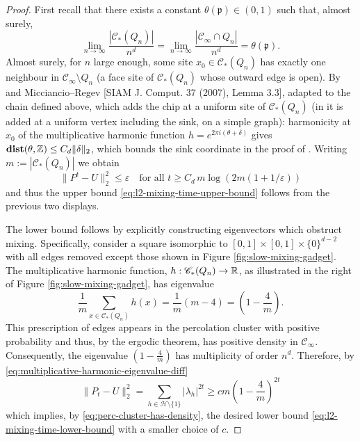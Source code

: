 \documentclass[12pt]{amsart}
\numberwithin{equation}{section}
\begin{document}
	\begin{proof}
		First recall that there exists a constant $\theta(\mathfrak{p}) \in (0,1)$ such that, almost surely, 
		\begin{equation} \label{eq:perc-cluster-has-density}
			\lim_{n \to \infty} \frac{|\mathscr{C}_{*}(Q_n)| }{n^d} = 	\lim_{n \to \infty} \frac{|\mathscr{C}_{\infty} \cap Q_n|}{n^d} = \theta(\mathfrak{p}).
		\end{equation}
		Almost surely, for $n$ large enough, some site $x_0 \in \mathscr{C}_{*}(Q_n)$ has exactly one neighbour in $\mathscr{C}_\infty \setminus Q_n$ (a face site of $\mathscr{C}_{*}(Q_n)$ whose outward edge is open). By \cite[Theorems 3.8 and 4.1]{jerison-levine-pike-2019} and Micciancio--Regev [SIAM J. Comput. 37 (2007), Lemma 3.3], adapted to the chain defined above, which adds the chip at a uniform site of $\mathscr{C}_{*}(Q_n)$ (in \cite{jerison-levine-pike-2019} it is added at a uniform vertex including the sink, on a simple graph): harmonicity at $x_0$ of the multiplicative harmonic function $h = e^{2 \pi i (\theta + \delta)}$ gives $\operatorname{\mathop{\bf dist{}}}(\theta , \operatorname{\mathbb{Z}}) \leq C_d \| \delta \|_2$, which bounds the sink coordinate in the proof of \cite[Theorem 3.8]{jerison-levine-pike-2019}. Writing $m := |\mathscr{C}_{*}(Q_n)|$ we obtain 
		\[
		\| P^t - U\|_2^2 \leq \varepsilon \quad \mbox{for all $t \geq  C_d \, m \log \left( 2 m (1 + 1/\varepsilon) \right)$}
		\]
		and thus the upper bound \eqref{eq:l2-mixing-time-upper-bound} follows from the previous two displays. 
		
		The lower bound follows by explicitly constructing eigenvectors which obstruct mixing. Specifically, 
		consider a square isomorphic to $[0, 1] \times [0,1] \times \{0\}^{d-2}$ with all edges removed
		except those shown in Figure \ref{fig:slow-mixing-gadget}.  The multiplicative harmonic function, $h: \mathscr{C}_*(Q_n) \to \operatorname{\mathbb{R}}$, as illustrated in the right of Figure \ref{fig:slow-mixing-gadget}, has eigenvalue 
		\[
		\frac{1}{m} \sum_{x \in \mathscr{C}_{*}(Q_n)} h(x) =  \frac{1}{m} \left( m - 4 \right) = (1 - \frac{4}{m}). 
		\]
		This prescription of edges appears in the percolation cluster with positive probability 
		and thus, by the ergodic theorem, has positive density in  $\mathscr{C}_{\infty}$. Consequently, the eigenvalue $(1 - \frac{4}{m})$ has multiplicity of order $n^d$. Therefore, by \eqref{eq:multiplicative-harmonic-eigenvalue-diff}
		\[
		\| P_t - U\|^2_2 = \sum_{h \in \mathcal{H} \setminus \{1\}} | \lambda_h|^{2 t}
		\geq c m (1- \frac{4}{m})^{2 t}
		\]
		which implies, by 	\eqref{eq:perc-cluster-has-density}, the desired lower bound \eqref{eq:l2-mixing-time-lower-bound} with a smaller choice of $c$. 
	\end{proof}
\end{document}
